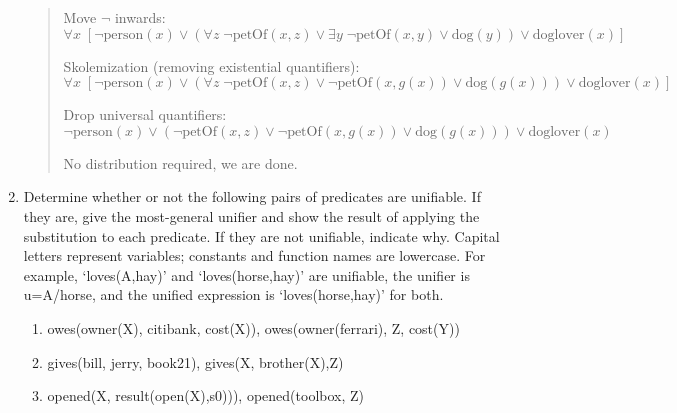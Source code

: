 \documentclass{article}
\theoremstyle{definition}
\newcommand{\<}{\langle}
\renewcommand{\>}{\rangle}
\begin{document}
\begin{enumerate}[label=\textbf{\arabic*.}]
\begin{quote}
    Move $\lnot$ inwards:
    \begin{equation*}
    \forall x\; [\lnot \text{person}(x) \lor ( \forall z \;\lnot\text{petOf}(x,z) \lor  \exists y \; \lnot\text{petOf}(x,y) \lor \text{dog}(y)) \lor \text{doglover}(x)]
    \end{equation*}

    Skolemization (removing existential quantifiers):
    \begin{equation*}
      \forall x\; [\lnot \text{person}(x) \lor (\forall z \;\lnot \text{petOf}(x, z) \lor \lnot\text{petOf}(x, g(x)) \lor \text{dog}(g(x))) \lor \text{doglover}(x)]
    \end{equation*}

    Drop universal quantifiers:
    \begin{equation*}
      \lnot \text{person}(x) \lor (\lnot \text{petOf}(x, z) \lor \lnot\text{petOf}(x, g(x)) \lor \text{dog}(g(x))) \lor \text{doglover}(x)
    \end{equation*}

    No distribution required, we are done.

  \end{quote}
  
  \newpage

  \item Determine whether or not the following pairs of predicates are unifiable. If they are, give the
  most-general unifier and show the result of applying the substitution to each predicate. If they are
  not unifiable, indicate why. Capital letters represent variables; constants and function names are
  lowercase. For example, ‘loves(A,hay)’ and ‘loves(horse,hay)’ are unifiable, the unifier is
  u={A/horse}, and the unified expression is ‘loves(horse,hay)’ for both.
  \begin{enumerate}
    \item owes(owner(X), citibank, cost(X)), owes(owner(ferrari), Z, cost(Y))
    \item gives(bill, jerry, book21), gives(X, brother(X),Z)
    \item opened(X, result(open(X),s0))), opened(toolbox, Z)
  \end{enumerate}


\end{enumerate}
\end{document}
